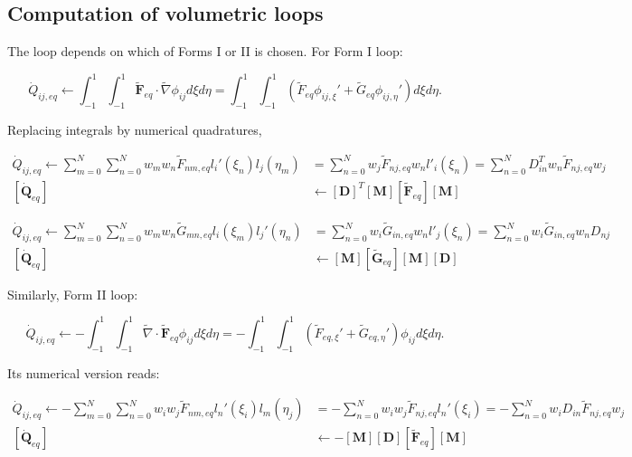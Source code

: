\documentclass[10pt,a4paper]{article}
\begin{document}
\subsection{Computation of volumetric loops}

The loop depends on which of Forms I or II is chosen. For Form I loop:

\begin{equation}
\dot{Q}_{ij,eq} \leftarrow \int_{-1}^1 \int_{-1}^1 \boldsymbol{\tilde{F}}_{eq}\cdot \tilde{\nabla} \phi_{ij} d\xi d\eta = \int_{-1}^1 \int_{-1}^1 (\tilde{F}_{eq}\phi_{ij,\xi}' + \tilde{G}_{eq}\phi_{ij,\eta}' )d\xi d\eta.
\end{equation}

Replacing integrals by numerical quadratures,

\begin{equation}
\begin{split}
\dot{Q}_{ij,eq} \leftarrow \sum_{m=0}^N \sum_{n=0}^N	 w_m w_n \tilde{F}_{nm,eq}l_i'(\xi_n)l_j(\eta_m) &= \sum_{n=0}^N w_j \tilde{F}_{nj,eq} w_n l'_i(\xi_n) =  \sum_{n=0}^N  D_{in}^T w_n\tilde{F}_{nj,eq} w_j \\
[\dot{\boldsymbol{Q}}_{eq}] &\leftarrow [\boldsymbol{D}]^T [\boldsymbol{M}] [\boldsymbol{\tilde{F}}_{eq}] [\boldsymbol{M}]
\end{split}
\end{equation}


\begin{equation}
\begin{split}
\dot{Q}_{ij,eq} \leftarrow \sum_{m=0}^N \sum_{n=0}^N	 w_m w_n \tilde{G}_{mn,eq}l_i(\xi_m)l_j'(\eta_n) &= \sum_{n=0}^N w_i \tilde{G}_{in,eq} w_n l'_j(\xi_n) =   \sum_{n=0}^N w_i \tilde{G}_{in,eq} w_n D_{nj} \\
[\dot{\boldsymbol{Q}}_{eq}]&\leftarrow [\boldsymbol{M}] [\boldsymbol{\tilde{G}}_{eq}] [\boldsymbol{M}][\boldsymbol{D}]
\end{split}
\end{equation}

Similarly, Form II loop:

\begin{equation}
\dot{Q}_{ij,eq} \leftarrow -\int_{-1}^1 \int_{-1}^1 \tilde{\nabla}\cdot \tilde{\boldsymbol{F}}_{eq} \phi_{ij} d\xi d\eta = -\int_{-1}^1 \int_{-1}^1 (\tilde{F}_{eq,\xi}' + \tilde{G}_{eq,\eta}')\phi_{ij}  d\xi d\eta.
\end{equation}

Its numerical version reads:

\begin{equation}
\begin{split}
\dot{Q}_{ij,eq} \leftarrow -\sum_{m=0}^N \sum_{n=0}^N	 w_i w_j \tilde{F}_{nm,eq}l_n'(\xi_i)l_m(\eta_j) &= -\sum_{n=0}^N	 w_i w_j \tilde{F}_{nj,eq}l_n'(\xi_i) =  -\sum_{n=0}^N w_i D_{in} \tilde{F}_{nj,eq} w_j  \\
[\dot{\boldsymbol{Q}}_{eq}] &\leftarrow -[\boldsymbol{M}] [\boldsymbol{D}] [\boldsymbol{\tilde{F}}_{eq}] [\boldsymbol{M}]
\end{split}
\end{equation}
\end{document}

